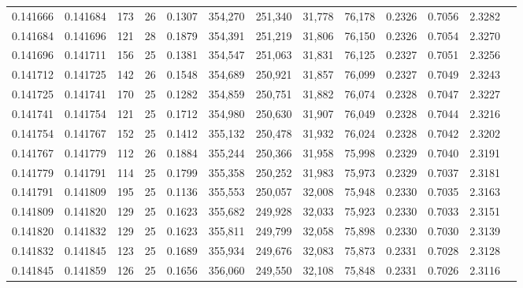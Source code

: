 \begin{tabular}{rrrrrrrrrrrrr}
0.141666 & 0.141684 &   173 &  26 &                                     0.1307 & 354,270 & 251,340 &  31,778 &  76,178 & 0.2326 & 0.7056 & 2.3282 \\
0.141684 & 0.141696 &   121 &  28 &                                     0.1879 & 354,391 & 251,219 &  31,806 &  76,150 & 0.2326 & 0.7054 & 2.3270 \\
0.141696 & 0.141711 &   156 &  25 &                                     0.1381 & 354,547 & 251,063 &  31,831 &  76,125 & 0.2327 & 0.7051 & 2.3256 \\
0.141712 & 0.141725 &   142 &  26 &                                     0.1548 & 354,689 & 250,921 &  31,857 &  76,099 & 0.2327 & 0.7049 & 2.3243 \\
0.141725 & 0.141741 &   170 &  25 &                                     0.1282 & 354,859 & 250,751 &  31,882 &  76,074 & 0.2328 & 0.7047 & 2.3227 \\
0.141741 & 0.141754 &   121 &  25 &                                     0.1712 & 354,980 & 250,630 &  31,907 &  76,049 & 0.2328 & 0.7044 & 2.3216 \\
0.141754 & 0.141767 &   152 &  25 &                                     0.1412 & 355,132 & 250,478 &  31,932 &  76,024 & 0.2328 & 0.7042 & 2.3202 \\
0.141767 & 0.141779 &   112 &  26 &                                     0.1884 & 355,244 & 250,366 &  31,958 &  75,998 & 0.2329 & 0.7040 & 2.3191 \\
0.141779 & 0.141791 &   114 &  25 &                                     0.1799 & 355,358 & 250,252 &  31,983 &  75,973 & 0.2329 & 0.7037 & 2.3181 \\
0.141791 & 0.141809 &   195 &  25 &                                     0.1136 & 355,553 & 250,057 &  32,008 &  75,948 & 0.2330 & 0.7035 & 2.3163 \\
0.141809 & 0.141820 &   129 &  25 &                                     0.1623 & 355,682 & 249,928 &  32,033 &  75,923 & 0.2330 & 0.7033 & 2.3151 \\
0.141820 & 0.141832 &   129 &  25 &                                     0.1623 & 355,811 & 249,799 &  32,058 &  75,898 & 0.2330 & 0.7030 & 2.3139 \\
0.141832 & 0.141845 &   123 &  25 &                                     0.1689 & 355,934 & 249,676 &  32,083 &  75,873 & 0.2331 & 0.7028 & 2.3128 \\
0.141845 & 0.141859 &   126 &  25 &                                     0.1656 & 356,060 & 249,550 &  32,108 &  75,848 & 0.2331 & 0.7026 & 2.3116 \\

\end{tabular}
